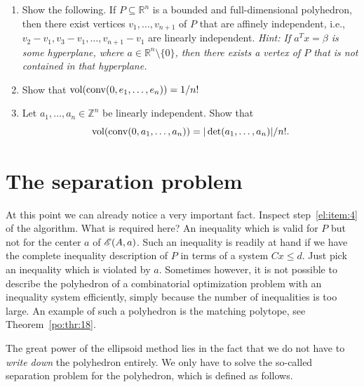 \begin{enumerate}
\item Show the following. If $P⊆ℝ^n$ is a bounded and full-dimensional polyhedron, then there exist vertices $v_1,\dots,v_{n+1}$ of $P$ that are affinely independent, i.e., $v_2-v_1, v_3-v_1, \dots, v_{n+1}-v_1$ are linearly independent. \emph{Hint: If $a^Tx = β$ is some hyperplane, where $a ∈ ℝ^n \setminus \{0\}$, then there exists a vertex of $P$ that is not contained in that hyperplane.}\label{exercise:3}
\item Show that $\mathrm{vol}(\operatorname{conv}(0,e_1,\dots,e_n)) = 1/n!$ \label{exercise:1}
\item Let $a_1,\dots,a_n ∈ℤ^n$ be linearly independent. Show that
  \begin{displaymath}
    \mathrm{vol}(\operatorname{conv}(0,a_1,\dots,a_n)) = |\det(a_1,\dots,a_n)| /n!. 
  \end{displaymath} \label{exercise:2}
\end{enumerate}

\section{The separation problem}
\label{el:sec:separation-problem}

At this point we can already notice a very important fact. Inspect
step~\ref{el:item:4} of the algorithm. What is required here? An
inequality which is valid for $P$ but not for the center $a$ of
$\mathscr{E}(A,a)$. Such an inequality is readily at hand if we have the
complete inequality description of $P$ in terms of a system
$Cx\leq d$. Just pick an inequality which is violated by $a$. Sometimes
however, it is not possible to describe the polyhedron of a
combinatorial optimization problem with an inequality system
efficiently, simply 
because the number of inequalities is too large.
An example of such a polyhedron is the matching polytope, see
Theorem~\ref{po:thr:18}. 

The great power of the ellipsoid method lies in the fact that we do
not have to \emph{write down} the polyhedron entirely. We only have to
solve the so-called separation problem for the polyhedron, which is
defined as follows. 




